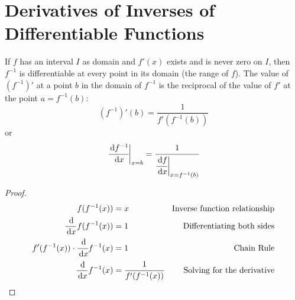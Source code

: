 \section{Derivatives of Inverses of Differentiable Functions}

\begin{theorem}\label{th:invderiv}
  If $f$ has an interval $I$ as domain and $f'(x)$ exists and is never zero on $I$, then $f^{-1}$ is differentiable at every point in its domain (the range of $f$). The value of $(f^{-1})'$ at a point $b$ in the domain of $f^{-1}$ is the reciprocal of the value of $f'$ at the point $a=f^{-1}(b)$:
    \begin{equation}
      (f^{-1})'(b)=\frac{1}{f'(f^{-1}(b))}
    \end{equation}
  or
    \begin{equation}
      \cfrac{\,\mathrm{d} f^{-1}}{\,\mathrm{d} x}\bigg|_{x=b}=\cfrac{1}{\cfrac{\,\mathrm{d} f}{\,\mathrm{d} x}\bigg|_{x=f^{-1}(b)}}
    \end{equation}
    \begin{proof}
      \begin{align*}
        f(f^{-1}(x)) &= x &\text{Inverse function relationship} \\
        \frac{\,\mathrm{d}}{\,\mathrm{d} x} f(f^{-1}(x)) &= 1 &\text{Differentiating both sides} \\
        f'(f^{-1}(x))\cdot \cfrac{\,\mathrm{d}}{\,\mathrm{d} x}f^{-1}(x) &= 1 &\text{Chain Rule} \\
        \frac{\,\mathrm{d}}{\,\mathrm{d} x}f^{-1}(x) &= \cfrac{1}{f'(f^{-1}(x))} &\text{Solving for the derivative}
      \end{align*}
    \end{proof}
\end{theorem}


